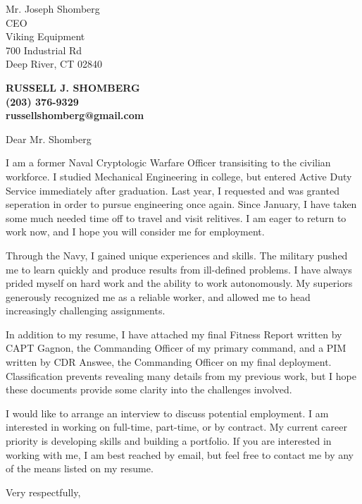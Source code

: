 \documentclass[10pt]{letter} %
\begin{document}
\signature{Russell J. Shomberg}                  %
\longindentation=0pt                       %
\let\raggedleft\raggedright                %
 
\begin{letter}
  {Mr. Joseph Shomberg \\
    CEO \\
    Viking Equipment \\
    700 Industrial Rd \\
    Deep River, CT 02840} 

\begin{center}
  \large\bf RUSSELL J. SHOMBERG \\
  (203) 376-9329 \\
  russellshomberg@gmail.com \\ 
\end{center} 


 
\opening{Dear Mr. Shomberg} 
 
\noindent I am a former Naval Cryptologic Warfare Officer transisiting to the civilian workforce. I studied Mechanical Engineering in college, but entered Active Duty Service immediately after graduation. Last year, I requested and was granted seperation in order to pursue engineering once again. Since January, I have taken some much needed time off to travel and visit relitives. I am eager to return to work now, and I hope you will consider me for employment.

\noindent Through the Navy, I gained unique experiences and skills. The military pushed me to learn quickly and produce results from ill-defined problems. I have always prided myself on hard work and the ability to work autonomously. My superiors generously recognized me as a reliable worker, and allowed me to head increasingly challenging assignments.

\noindent In addition to my resume, I have attached my final Fitness Report written by CAPT Gagnon, the Commanding Officer of my primary command, and a PIM written by CDR Answee, the Commanding Officer on my final deployment. Classification prevents revealing many details from my previous work, but I hope these documents provide some clarity into the challenges involved.

\noindent I would like to arrange an interview to discuss potential employment. I am interested in working on full-time, part-time, or by contract. My current career priority is developing skills and building a portfolio. If you are interested in working with me, I am best reached by email, but feel free to contact me by any of the  means listed on my resume.
 
\closing{Very respectfully,}
 
 

\end{letter}
 
\end{document}
